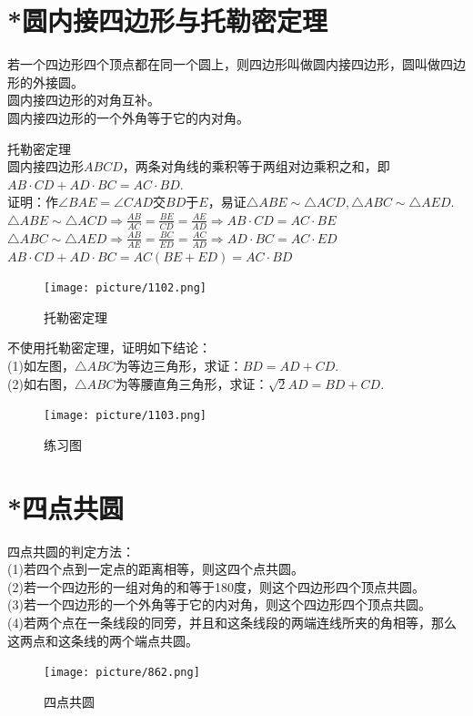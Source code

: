 \documentclass{ecnuthesis}
\begin{document}
\section{*圆内接四边形与托勒密定理}
\begin{knowledge}
    若一个四边形四个顶点都在同一个圆上，则四边形叫做圆内接四边形，圆叫做四边形的外接圆。\\
    圆内接四边形的对角互补。\\
    圆内接四边形的一个外角等于它的内对角。
\end{knowledge}
\begin{knowledge}
    托勒密定理 \\
    圆内接四边形$ABCD$，两条对角线的乘积等于两组对边乘积之和，即$AB·CD+AD·BC=AC·BD$. \\
    证明：作$\angle BAE=\angle CAD$交$BD$于$E$，易证$\triangle ABE\sim \triangle ACD,\triangle ABC \sim \triangle AED$. \\
    $\triangle ABE \sim \triangle ACD \Rightarrow \frac{AB}{AC}=\frac{BE}{CD}=\frac{AE}{AD} \Rightarrow AB·CD=AC·BE$ \\
    $\triangle ABC \sim \triangle AED \Rightarrow \frac{AB}{AE}=\frac{BC}{ED}=\frac{AC}{AD} \Rightarrow AD·BC=AC·ED$ \\
    $AB·CD+AD·BC=AC(BE+ED)=AC·BD$ \\
\end{knowledge}
\begin{figure}[H]
\centering
\texttt{[image: picture/1102.png]}
\caption{托勒密定理}
\end{figure}
\begin{problem}
    不使用托勒密定理，证明如下结论：\\
    (1)如左图，$\triangle ABC$为等边三角形，求证：$BD=AD+CD$. \\
    (2)如右图，$\triangle ABC$为等腰直角三角形，求证：$\sqrt{2}AD=BD+CD$.
\end{problem}
\begin{figure}[H]
\centering
\texttt{[image: picture/1103.png]}
\caption{练习图}
\end{figure}
\clearpage
\section{*四点共圆}
\begin{knowledge}
    四点共圆的判定方法：\\
    (1)若四个点到一定点的距离相等，则这四个点共圆。\\
    (2)若一个四边形的一组对角的和等于180度，则这个四边形四个顶点共圆。\\
    (3)若一个四边形的一个外角等于它的内对角，则这个四边形四个顶点共圆。\\
    (4)若两个点在一条线段的同旁，并且和这条线段的两端连线所夹的角相等，那么这两点和这条线的两个端点共圆。
\end{knowledge}
\begin{figure}[H]
\centering
\texttt{[image: picture/862.png]}
\caption{四点共圆}
\end{figure}
\clearpage
\end{document}
